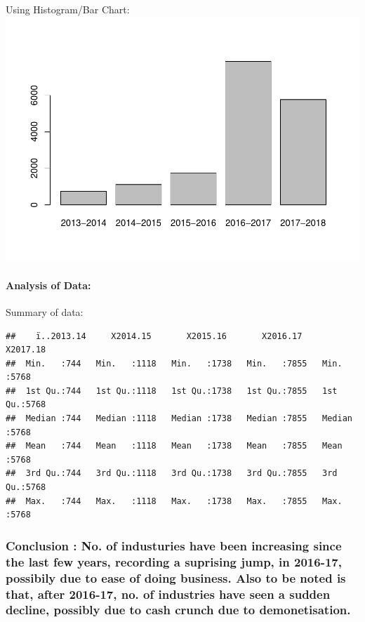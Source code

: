 \documentclass[]{article}
\let\oldparagraph\paragraph
\renewcommand{\paragraph}[1]{\oldparagraph{#1}\mbox{}}
\begin{document}
Using Histogram/Bar Chart:
\includegraphics{Report_files/figure-latex/unnamed-chunk-3-1.pdf}

\paragraph{Analysis of Data:}\label{analysis-of-data}

Summary of data:

\begin{verbatim}
##    ï..2013.14     X2014.15       X2015.16       X2016.17       X2017.18   
##  Min.   :744   Min.   :1118   Min.   :1738   Min.   :7855   Min.   :5768  
##  1st Qu.:744   1st Qu.:1118   1st Qu.:1738   1st Qu.:7855   1st Qu.:5768  
##  Median :744   Median :1118   Median :1738   Median :7855   Median :5768  
##  Mean   :744   Mean   :1118   Mean   :1738   Mean   :7855   Mean   :5768  
##  3rd Qu.:744   3rd Qu.:1118   3rd Qu.:1738   3rd Qu.:7855   3rd Qu.:5768  
##  Max.   :744   Max.   :1118   Max.   :1738   Max.   :7855   Max.   :5768
\end{verbatim}

\subsubsection{\texorpdfstring{\textbf{Conclusion} : No. of industuries
have been increasing since the last few years, recording a suprising
jump, in 2016-17, possibily due to ease of doing business. Also to be
noted is that, after 2016-17, no. of industries have seen a sudden
decline, possibly due to cash crunch due to
demonetisation.}{Conclusion : No. of industuries have been increasing since the last few years, recording a suprising jump, in 2016-17, possibily due to ease of doing business. Also to be noted is that, after 2016-17, no. of industries have seen a sudden decline, possibly due to cash crunch due to demonetisation.}}\label{conclusion-no.-of-industuries-have-been-increasing-since-the-last-few-years-recording-a-suprising-jump-in-2016-17-possibily-due-to-ease-of-doing-business.-also-to-be-noted-is-that-after-2016-17-no.-of-industries-have-seen-a-sudden-decline-possibly-due-to-cash-crunch-due-to-demonetisation.}
\end{document}
